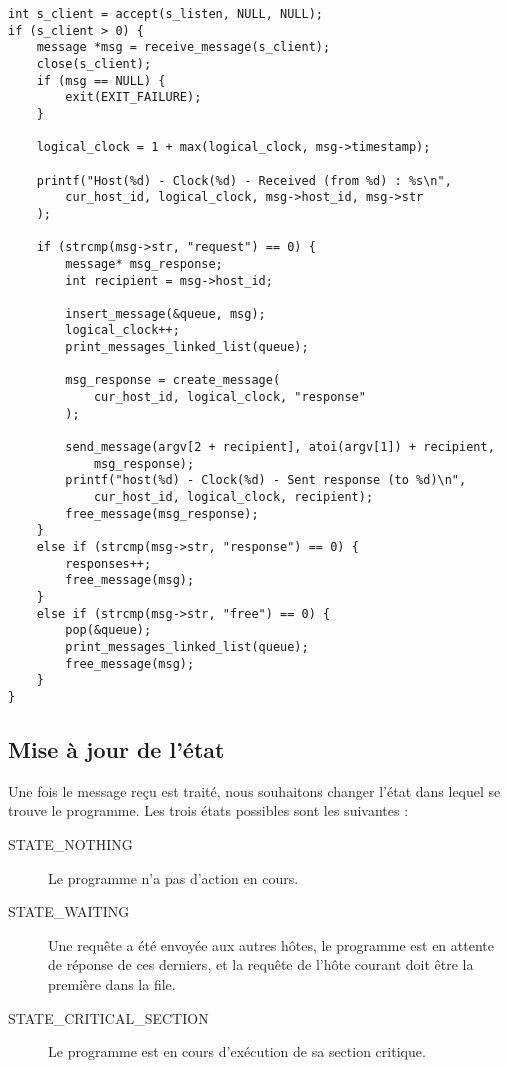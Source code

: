 \begin{lstlisting}[caption={Récupération d'un message \& traitement}]
int s_client = accept(s_listen, NULL, NULL);
if (s_client > 0) {
    message *msg = receive_message(s_client);
    close(s_client);
    if (msg == NULL) {
        exit(EXIT_FAILURE);
    }

    logical_clock = 1 + max(logical_clock, msg->timestamp);

    printf("Host(%d) - Clock(%d) - Received (from %d) : %s\n",
        cur_host_id, logical_clock, msg->host_id, msg->str
    );

    if (strcmp(msg->str, "request") == 0) {
        message* msg_response;
        int recipient = msg->host_id;

        insert_message(&queue, msg);
        logical_clock++;
        print_messages_linked_list(queue);

        msg_response = create_message(
            cur_host_id, logical_clock, "response"
        );

        send_message(argv[2 + recipient], atoi(argv[1]) + recipient,
            msg_response);
        printf("host(%d) - Clock(%d) - Sent response (to %d)\n",
            cur_host_id, logical_clock, recipient);
        free_message(msg_response);
    }
    else if (strcmp(msg->str, "response") == 0) {
        responses++;
        free_message(msg);
    }
    else if (strcmp(msg->str, "free") == 0) {
        pop(&queue);
        print_messages_linked_list(queue);
        free_message(msg);
    }
}
\end{lstlisting}

\subsection{Mise à jour de l'état}
Une fois le message reçu est traité, nous souhaitons changer l'état dans lequel se trouve le programme. Les trois états possibles sont les suivantes :\\

\begin{description}
    \item[STATE\_NOTHING] Le programme n'a pas d'action en cours.
    \item[STATE\_WAITING] Une requête a été envoyée aux autres hôtes, le programme est en attente de réponse de ces derniers, et la requête de l'hôte courant doit être la première dans la file.
    \item[STATE\_CRITICAL\_SECTION] Le programme est en cours d'exécution de sa section critique.
\end{description}
\

